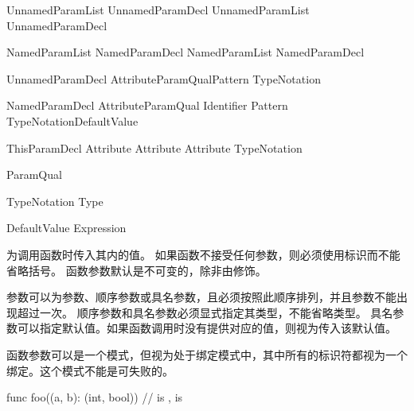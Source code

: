 \begin{bnf}{UnnamedParamList}
    UnnamedParamDecl \br
    UnnamedParamList \terminal{,} UnnamedParamDecl
\end{bnf}

\begin{bnf}{NamedParamList}
    NamedParamDecl \br
    NamedParamList \terminal{,} NamedParamDecl
\end{bnf}

\begin{bnf}{UnnamedParamDecl}
    Attribute\bnfs ParamQual\bnfq Pattern TypeNotation\bnfq
\end{bnf}

\begin{bnf}{NamedParamDecl}
    Attribute\bnfs ParamQual\bnfq \terminal{(} Identifier \terminal{)} Pattern TypeNotation\bnfq DefaultValue\bnfq
\end{bnf}

\begin{bnf}{ThisParamDecl}
    Attribute\bnfs {}\bnfq {} \br
    Attribute\bnfs \terminal{\&} \bnfq {} \br
    Attribute\bnfs {} TypeNotation
\end{bnf}

\begin{bnf}{ParamQual}
     \br
     \br
      \br
\end{bnf}

\begin{bnf}{TypeNotation}
    \terminal{:} Type
\end{bnf}

\begin{bnf}{DefaultValue}
    \terminal{=} Expression
\end{bnf}

\pnum
{}为调用函数时传入其内的值。
如果函数不接受任何参数，则必须使用\tcode{()}标识而不能省略括号。
函数参数默认是不可变的，除非由修饰。

\pnum
参数可以为参数、顺序参数或具名参数，且必须按照此顺序排列，并且参数不能出现超过一次。
顺序参数和具名参数必须显式指定其类型，不能省略类型。
具名参数可以指定默认值。如果函数调用时没有提供对应的值，则视为传入该默认值。

\pnum
函数参数可以是一个模式，但视为处于绑定模式中，其中所有的标识符都视为一个绑定。这个模式不能是可失败的。

\enterexample
\begin{codeblock}

func foo((a, b): (int, bool)) {
    //  is ,  is 
}

\end{codeblock}
\exitexample

